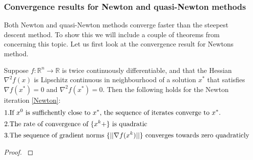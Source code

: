 \subsubsection{Convergence results for Newton and quasi-Newton methods}
Both Newton and quasi-Newton methods converge faster than the steepest descent method. To show this we will include a couple of theorems from \cite{nocedal2006numerical}
concerning this topic. Let us first look at the convergence result for Newtons method.
\begin{theorem}
Suppose $f:\mathbb{R}^n\rightarrow\mathbb{R}$ is twice continuously differentiable, and that the Hessian $\nabla^2 f(x)$ is Lipschitz continuous in neighbourhood of a solution $x^*$ that satisfies $\nabla f(x^*)=0$ and $\nabla^2 f(x^*)=0$. Then the following holds for the Newton iteration \ref{Newton}:
\begin{align*}
1.&\textrm{If $x^0$ is suffichently close to $x^*$, the sequence of iterates converge to $x^*$.}\\
2.&\textrm{The rate of convergence of $\{x^k+\}$ is quadratic}\\
3.&\textrm{The sequence of gradient norms $ \{||\nabla f(x^k)||\}$ converges towards zero quadraticly}
\end{align*}
\end{theorem}
\begin{proof}
\cite{nocedal2006numerical}
\end{proof}

